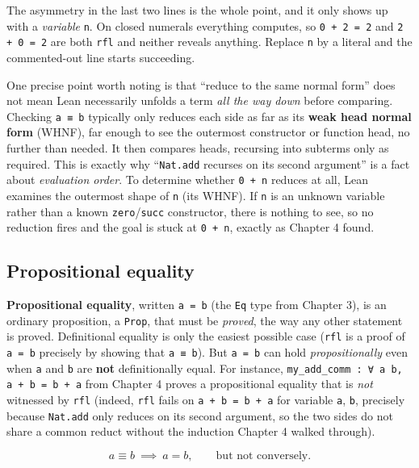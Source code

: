 The asymmetry in the last two lines is the whole point, and it only shows up with a \emph{variable} \texttt{n}. On closed numerals everything computes, so \texttt{0 + 2 = 2} and \texttt{2 + 0 = 2} are both \texttt{rfl} and neither reveals anything. Replace \texttt{n} by a literal and the commented-out line starts succeeding.

One precise point worth noting is that ``reduce to the same normal form'' does not mean Lean necessarily unfolds a term \emph{all the way down} before comparing. Checking \texttt{a ≡ b} typically only reduces each side as far as its \textbf{weak head normal form} (WHNF), far enough to see the outermost constructor or function head, no further than needed. It then compares heads, recursing into subterms only as required. This is exactly why ``\texttt{Nat.add} recurses on its second argument'' is a fact about \emph{evaluation order}. To determine whether \texttt{0 + n} reduces at all, Lean examines the outermost shape of \texttt{n} (its WHNF). If \texttt{n} is an unknown variable rather than a known \texttt{zero}/\texttt{succ} constructor, there is nothing to see, so no reduction fires and the goal is stuck at \texttt{0 + n}, exactly as Chapter 4 found.

\subsection{Propositional equality}\label{sec:05-rigor-check:04-defeq-vs-propeq:3}

\textbf{Propositional equality}, written \texttt{a = b} (the \texttt{Eq} type from Chapter 3), is an ordinary proposition, a \texttt{Prop}, that must be \emph{proved}, the way any other statement is proved. Definitional equality is only the easiest possible case (\texttt{rfl} is a proof of \texttt{a = b} precisely by showing that \texttt{a ≡ b}). But \texttt{a = b} can hold \emph{propositionally} even when \texttt{a} and \texttt{b} are \textbf{not} definitionally equal. For instance, \texttt{my\_\allowbreak{}add\_\allowbreak{}comm : ∀ a b, a + b = b + a} from Chapter 4 proves a propositional equality that is \emph{not} witnessed by \texttt{rfl} (indeed, \texttt{rfl} fails on \texttt{a + b = b + a} for variable \texttt{a}, \texttt{b}, precisely because \texttt{Nat.add} only reduces on its second argument, so the two sides do not share a common reduct without the induction Chapter 4 walked through).

\[
a \equiv b \ \implies\ a = b, \qquad\text{but not conversely.}
\]

